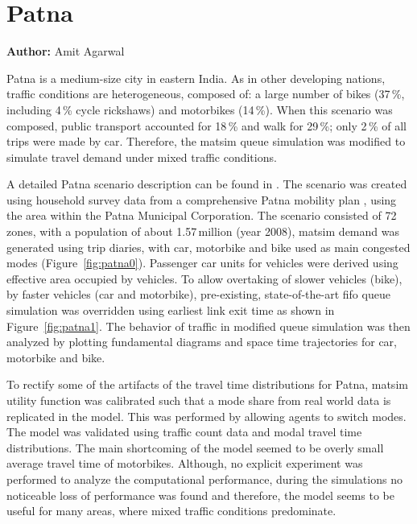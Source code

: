\section{Patna}
\label{sec:patna}
\hfill \textbf{Author:} Amit Agarwal

Patna is a medium-size city in eastern India. As in other developing nations, traffic conditions are heterogeneous, composed of: a large number of bikes (37\,\%, including 4\,\% cycle rickshaws) and motorbikes (14\,\%). When this scenario was composed, public transport accounted for 18\,\% and walk for 29\,\%; only 2\,\% of all trips were made by car. Therefore, the \gls{matsim} queue simulation was modified to simulate travel demand under mixed traffic conditions.

A detailed Patna scenario description can be found in \citet[][]{AgarwalEtcMixedTraffic}. The scenario was created using household survey data from a comprehensive Patna mobility plan \citep[][]{TrippItransVks2009PatnaReport}, using the area within the Patna Municipal Corporation. The scenario consisted of 72\,zones, with a population of about 1.57\,million (year 2008), \gls{matsim} demand was generated using trip diaries, with car, motorbike and bike used as main congested modes (Figure~\ref{fig:patna0}). Passenger car units for vehicles were derived using effective area occupied by vehicles. To allow overtaking of slower vehicles (bike), by faster vehicles (car and motorbike), pre-existing, state-of-the-art \gls{fifo} queue simulation was overridden using earliest link exit time as shown in Figure~\ref{fig:patna1}. The behavior of traffic in modified queue simulation was then analyzed by plotting fundamental diagrams and space time trajectories for car, motorbike and bike.

To rectify some of the artifacts of the travel time distributions for Patna, \gls{matsim} utility function was calibrated such that a mode share from real world data is replicated in the model. This was performed by allowing agents to switch modes. The model was validated using traffic count data and modal travel time distributions. The main shortcoming of the model seemed to be overly small average travel time of motorbikes. Although, no explicit experiment was performed to analyze the computational performance, during the simulations no noticeable loss of performance was found and therefore, the model seems to be useful for many areas, where mixed traffic conditions predominate.

